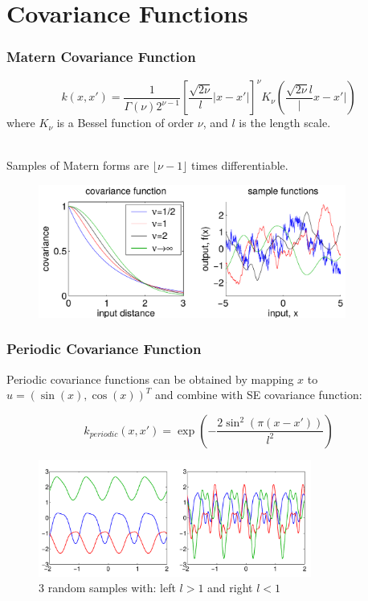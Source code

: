 \documentclass[10pt]{beamer}
\begin{document}
  \section{Covariance Functions}

  \begin{frame}
    \frametitle{Matern Covariance Function}

    \begin{equation*}
      k(x,x') = \frac{1}{\Gamma(\nu) 2^{\nu - 1}} \left[ \frac{\sqrt{2 \nu}}{l} |x - x'| \right]^{\nu} K_{\nu} \left( \frac{\sqrt{2 \nu}{l}} |x - x'| \right)
    \end{equation*}
    where $K_{\nu}$ is a Bessel function of order $\nu$, and $l$ is the length scale.\\~

    Samples of Matern forms are $\lfloor \nu - 1 \rfloor$ times differentiable.

    \begin{figure}
      \centering
      \includegraphics[width=0.9\textwidth]{maternCovFunc.png}
    \end{figure}

  \end{frame}

  \begin{frame}
    \frametitle{Periodic Covariance Function}
    Periodic covariance functions can be obtained by mapping $x$ to $u = (\sin(x), \cos(x))^T$ and combine with SE covariance function:

    \begin{equation*}
      k_{periodic} (x,x') = \exp \left( - \frac{2 \sin^2(\pi (x - x'))}{l^2} \right)
    \end{equation*}

    \begin{figure}
      \centering
      \includegraphics[width=0.8\textwidth]{periodicCovFunc.png}
      \caption*{3 random samples with: left $l > 1$ and right $l < 1$}
    \end{figure}
  \end{frame}
\end{document}

